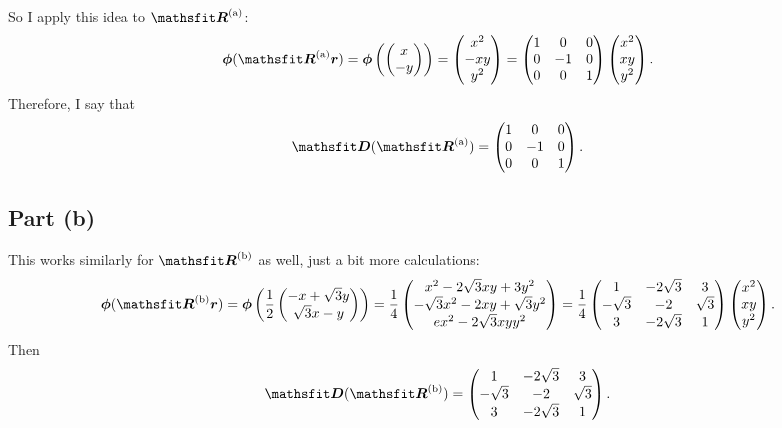 \documentclass[11pt, english, fleqn, DIV=15, headinclude, BCOR=1cm]{scrartcl}
\begin{document}
So I apply this idea to $\Ra$:
\[
    \vec\phi(\Ra \vec r)
    =
    \vec\phi\del{
        \begin{pmatrix}
            x \\ -y
        \end{pmatrix}
    }
    = 
    \begin{pmatrix}
        x^2 \\ -xy \\ y^2
    \end{pmatrix}
    =
    \begin{pmatrix}
        1 & 0 & 0 \\
        0 & -1 & 0 \\
        0 & 0 & 1
    \end{pmatrix}
    \begin{pmatrix}
        x^2 \\ xy \\ y^2
    \end{pmatrix}.
\]
Therefore, I say that
\[
    \tens D(\Ra) = 
    \begin{pmatrix}
        1 & 0 & 0 \\
        0 & -1 & 0 \\
        0 & 0 & 1
    \end{pmatrix}.
\]

\subsection{Part (b)}

This works similarly for $\Rb$ as well, just a bit more calculations:
\[
    \vec \phi(\Rb \vec r)
    =
    \vec \phi\del{
        \frac12
        \begin{pmatrix}
            -x + \sqrt3 y \\
            \sqrt3 x - y
        \end{pmatrix}
    }
    =
    \frac14
    \begin{pmatrix}
        x^2 - 2\sqrt3 xy + 3y^2 \\
        - \sqrt3 x^2 - 2 xy + \sqrt3 y^2 \\
        e x^2 - 2 \sqrt 3 xy y^2
    \end{pmatrix}
    =
    \frac14
    \begin{pmatrix}
        1 & -2\sqrt3 & 3 \\
        -\sqrt3 & -2 & \sqrt3 \\
        3 & -2\sqrt3 & 1
    \end{pmatrix}
    \begin{pmatrix}
        x^2 \\ xy \\ y^2
    \end{pmatrix}.
\]
Then
\[
    \tens D(\Rb) =
    \begin{pmatrix}
        1 & -2\sqrt3 & 3 \\
        -\sqrt3 & -2 & \sqrt3 \\
        3 & -2\sqrt3 & 1
    \end{pmatrix}.
\]
\end{document}
